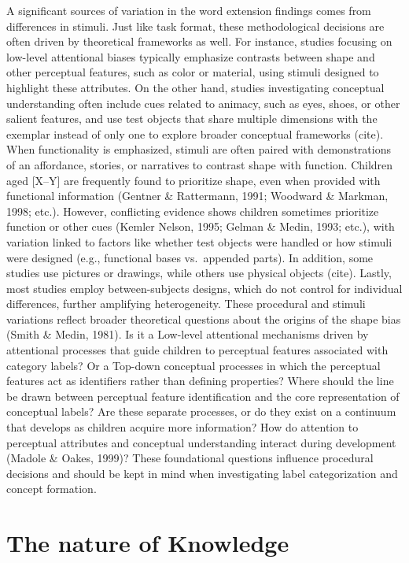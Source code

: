 \documentclass[10pt, letterpaper]{article}
\begin{document}
A significant sources of variation in the word extension findings comes
from differences in stimuli. Just like task format, these methodological
decisions are often driven by theoretical frameworks as well. For
instance, studies focusing on low-level attentional biases typically
emphasize contrasts between shape and other perceptual features, such as
color or material, using stimuli designed to highlight these attributes.
On the other hand, studies investigating conceptual understanding often
include cues related to animacy, such as eyes, shoes, or other salient
features, and use test objects that share multiple dimensions with the
exemplar instead of only one to explore broader conceptual frameworks
(cite). When functionality is emphasized, stimuli are often paired with
demonstrations of an affordance, stories, or narratives to contrast
shape with function. Children aged {[}X--Y{]} are frequently found to
prioritize shape, even when provided with functional information
(Gentner \& Rattermann, 1991; Woodward \& Markman, 1998; etc.). However,
conflicting evidence shows children sometimes prioritize function or
other cues (Kemler Nelson, 1995; Gelman \& Medin, 1993; etc.), with
variation linked to factors like whether test objects were handled or
how stimuli were designed (e.g., functional bases vs.~appended parts).
In addition, some studies use pictures or drawings, while others use
physical objects (cite). Lastly, most studies employ between-subjects
designs, which do not control for individual differences, further
amplifying heterogeneity. These procedural and stimuli variations
reflect broader theoretical questions about the origins of the shape
bias (Smith \& Medin, 1981). Is it a Low-level attentional mechanisms
driven by attentional processes that guide children to perceptual
features associated with category labels? Or a Top-down conceptual
processes in which the perceptual features act as identifiers rather
than defining properties? Where should the line be drawn between
perceptual feature identification and the core representation of
conceptual labels? Are these separate processes, or do they exist on a
continuum that develops as children acquire more information? How do
attention to perceptual attributes and conceptual understanding interact
during development (Madole \& Oakes, 1999)? These foundational questions
influence procedural decisions and should be kept in mind when
investigating label categorization and concept formation.

\hypertarget{the-nature-of-knowledge}{%
\section{The nature of Knowledge}\label{the-nature-of-knowledge}}
\end{document}
